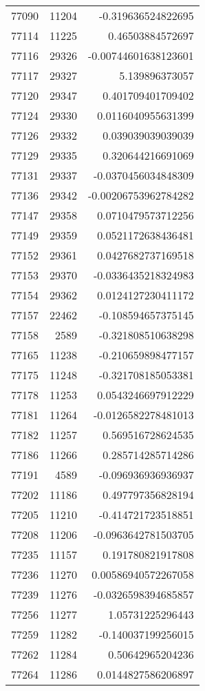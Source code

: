 \begin{tabular}{r | r | r}
77090 & 11204 & -0.319636524822695 \\
77114 & 11225 & 0.46503884572697 \\
77116 & 29326 & -0.00744601638123601 \\
77117 & 29327 & 5.139896373057 \\
77120 & 29347 & 0.401709401709402 \\
77124 & 29330 & 0.0116040955631399 \\
77126 & 29332 & 0.039039039039039 \\
77129 & 29335 & 0.320644216691069 \\
77131 & 29337 & -0.0370456034848309 \\
77136 & 29342 & -0.00206753962784282 \\
77147 & 29358 & 0.0710479573712256 \\
77149 & 29359 & 0.0521172638436481 \\
77152 & 29361 & 0.0427682737169518 \\
77153 & 29370 & -0.0336435218324983 \\
77154 & 29362 & 0.0124127230411172 \\
77157 & 22462 & -0.108594657375145 \\
77158 & 2589 & -0.321808510638298 \\
77165 & 11238 & -0.210659898477157 \\
77175 & 11248 & -0.321708185053381 \\
77178 & 11253 & 0.0543246697912229 \\
77181 & 11264 & -0.0126582278481013 \\
77182 & 11257 & 0.569516728624535 \\
77186 & 11266 & 0.285714285714286 \\
77191 & 4589 & -0.096936936936937 \\
77202 & 11186 & 0.497797356828194 \\
77205 & 11210 & -0.414721723518851 \\
77208 & 11206 & -0.0963642781503705 \\
77235 & 11157 & 0.191780821917808 \\
77236 & 11270 & 0.00586940572267058 \\
77239 & 11276 & -0.0326598394685857 \\
77256 & 11277 & 1.05731225296443 \\
77259 & 11282 & -0.140037199256015 \\
77262 & 11284 & 0.50642965204236 \\
77264 & 11286 & 0.0144827586206897 \\

\end{tabular}
